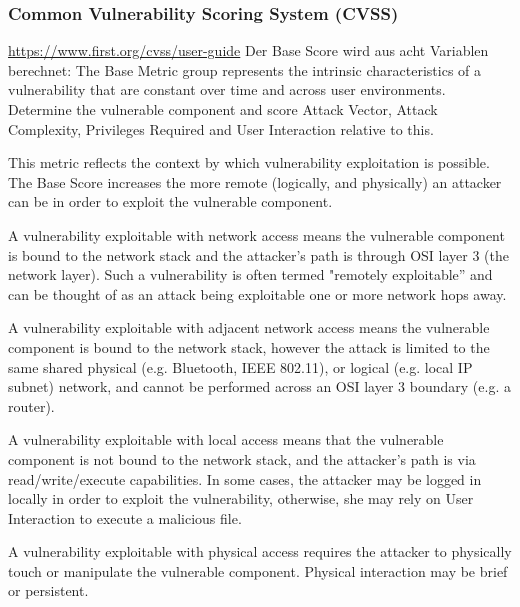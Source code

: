 \subsubsection{Common Vulnerability Scoring System (CVSS)}
\label{sec:sota_sa_cvss}
    \url{https://www.first.org/cvss/user-guide}
    Der Base Score wird aus acht Variablen berechnet:
    The Base Metric group represents the intrinsic characteristics of a vulnerability that are constant over time and across user environments. 
    Determine the vulnerable component and score Attack Vector, Attack Complexity, Privileges Required and User Interaction relative to this.
    \begin{description}[itemsep=1em,align=left]
        \item [Attack Vector:] This metric reflects the context by which vulnerability exploitation is possible. 
            The Base Score increases the more remote (logically, and physically) an attacker can be in order to exploit the vulnerable component.
            \begin{description}[noitemsep,align=left]
                \item [Network:] A vulnerability exploitable with network access means the vulnerable component is bound to the network stack and the attacker's path is through OSI layer 3 (the network layer). 
                Such a vulnerability is often termed "remotely exploitable” and can be thought of as an attack being exploitable one or more network hops away.
                \item [Adjacent:] A vulnerability exploitable with adjacent network access means the vulnerable component is bound to the network stack, however the attack is limited to the same shared physical (e.g. Bluetooth, IEEE 802.11), or logical (e.g. local IP subnet) network, and cannot be performed across an OSI layer 3 boundary (e.g. a router).
                \item [Local:] A vulnerability exploitable with local access means that the vulnerable component is not bound to the network stack, and the attacker’s path is via read/write/execute capabilities. 
                    In some cases, the attacker may be logged in locally in order to exploit the vulnerability, otherwise, she may rely on User Interaction to execute a malicious file.
                \item [Physical:] A vulnerability exploitable with physical access requires the attacker to physically touch or manipulate the vulnerable component. Physical interaction may be brief or persistent.

\end{description}
\end{description}
